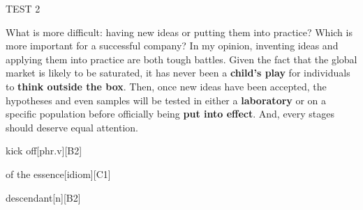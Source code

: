 \begin{glossarymc}[Cambridge 7]
\begin{test}{TEST 2}
    \begin{qa}{What is more difficult: having new ideas or putting them into practice? Which is more important for a successful company?}
    In my opinion, inventing ideas and applying them into practice are both tough battles. Given the fact that the global market is likely to be saturated, it has never been a \textbf{child’s play} for individuals to \textbf{think outside the box}. Then, once new ideas have been accepted, the hypotheses and even samples will be tested in either a \textbf{laboratory} or on a specific population before officially being \textbf{put into effect}. And, every stages should deserve equal attention.
    \end{qa}

        \begin{VocabExplain}[Part 3]
            \begin{ExplainCard}{kick off}[phr.v][B2]
            \end{ExplainCard}

            \begin{ExplainCard}{of the essence}[idiom][C1]
                \end{ExplainCard}

                \begin{ExplainCard}{descendant}[n][B2]
                \end{ExplainCard}


\end{VocabExplain}
\end{test}
\end{glossarymc}
